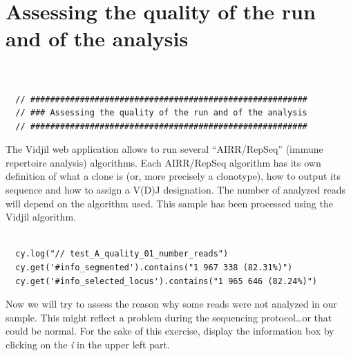 
\section{Assessing the quality of the run and of the analysis}
\label{sec:run-quality}
\begin{verbatim}


  // ########################################################
  // ### Assessing the quality of the run and of the analysis
  // ########################################################

\end{verbatim}

The Vidjil web application allows to run several ``AIRR/RepSeq'' (immune repertoire analysis) algorithms.
Each AIRR/RepSeq algorithm has its own definition of what a clone is (or, more precisely
a clonotype), how to output its sequence and how to assign a V(D)J designation.
The number of analyzed reads will depend on the algorithm used.
This sample has been processed using the Vidjil algorithm.


\begin{verbatim}

  cy.log("// test_A_quality_01_number_reads")
  cy.get('#info_segmented').contains("1 967 338 (82.31%)")
  cy.get('#info_selected_locus').contains("1 965 646 (82.24%)")

\end{verbatim}

Now we will try to assess the reason why some reads were not analyzed in our
sample.
This might reflect a problem during the sequencing protocol\dots or that could
be normal.
For the sake of this exercise, display the information box by clicking on the
\textit{i} in the upper left part.

